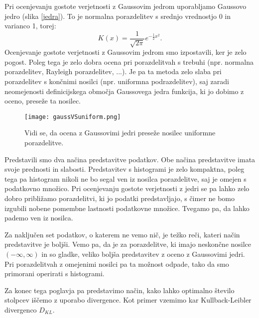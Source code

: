 Pri ocenjevanju gostote verjetnosti z Gaussovim jedrom uporabljamo Gaussovo jedro (slika \ref{jedra}). To je normalna porazdelitev s srednjo vrednostjo 0 in varianco 1, torej:
\begin{equation}
	K(x) = \frac{1}{\sqrt{2\pi}}e^{-\frac{1}{2}x^2}.
\end{equation}
Ocenjevanje gostote verjetnosti z Gaussovim jedrom smo izpostavili, ker je zelo pogost. Poleg tega je zelo dobra ocena pri porazdelitvah s trebuhi (npr. normalna porazdelitev, Rayleigh porazdelitev, ...). Je pa ta metoda zelo slaba pri porazdelitev s končnimi nosilci (npr. uniformna podrazdelitev), saj zaradi neomejenosti definicijskega območja Gaussovega jedra funkcija, ki jo dobimo z oceno, preseže ta nosilec.

\begin{figure}[!h]
    \centering
    \texttt{[image: gaussVSuniform.png]}
    \caption{Vidi se, da ocena z Gaussovimi jedri preseže nosilec uniformne porazdelitve.}
\end{figure}
\pagebreak
Predstavili smo dva načina predstavitve podatkov. Obe načina predstavitve imata svoje prednosti in slabosti. Predstavitev s histogrami je zelo kompaktna, poleg tega pa histogram nikoli ne bo segal ven iz nosilca porazdelitve, saj je omejen s podatkovno množico. Pri ocenjevanju gostote verjetnosti z jedri se pa lahko zelo dobro približamo porazdelitvi, ki jo podatki predstavljajo, s čimer ne bomo izgubili nobene pomembne lastnosti podatkovne množice. Tvegamo pa, da lahko pademo ven iz nosilca.

Za naključen set podatkov, o katerem ne vemo nič, je težko reči, kateri način predstavitve je boljši. Vemo pa, da je za porazdelitve, ki imajo neskončne nosilce $(-\infty, \infty)$ in so gladke, veliko boljša predstavitev z oceno z Gaussovimi jedri. Pri porazdelitvah z omejenimi nosilci pa ta možnost odpade, tako da smo primorani operirati s histogrami.

Za konec tega poglavja pa predstavimo način, kako lahko optimalno število stolpcev iščemo z uporabo divergence. Kot primer vzemimo kar Kullback-Leibler divergenco $D_{KL}$.